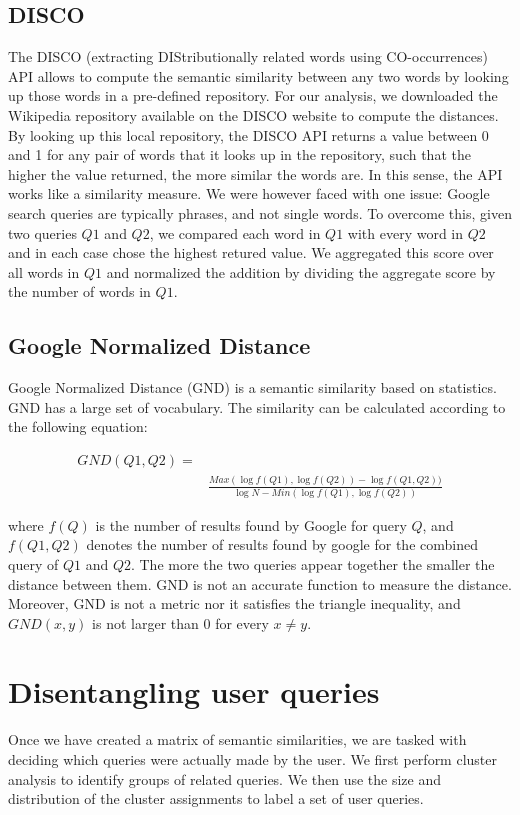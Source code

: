 \documentclass[11pt]{article}
\begin{document}
\begin{multicols}{2}
\subsection{DISCO}
\label{sec:disco}
The DISCO (extracting DIStributionally related words using CO-occurrences) API allows to compute the semantic similarity between any two words by looking up those words in a pre-defined repository. For our analysis, we downloaded the Wikipedia repository available on the DISCO website to compute the distances. By looking up this local repository, the DISCO API returns a value between 0 and 1 for any pair of words that it looks up in the repository, such that the higher the value returned, the more similar the words are. In this sense, the API works like a similarity measure. We were however faced with one issue: Google search queries are typically phrases, and not single words. To overcome this, given two queries $Q1$ and $Q2$, we compared each word in $Q1$ with every word in $Q2$ and in each case chose the highest retured value. We aggregated this score over all words in $Q1$ and normalized the addition by dividing the aggregate score by the number of words in $Q1$.

\subsection{Google Normalized Distance}
\label{sec:gnd}
Google Normalized Distance (GND) is a semantic similarity based on statistics. GND has a large set of vocabulary. The similarity can be calculated according to the following equation:

\begin{eqnarray}
\label{eq:gnd}
GND(Q1, Q2) =& \nonumber \\
&\frac{Max(\log f(Q1), \log f(Q2))-\log f(Q1, Q2))}{\log N - Min(\log f(Q1), \log f(Q2))}
\end{eqnarray}

where $f(Q)$ is the number of results found by Google for query $Q$, and $f(Q1, Q2)$ denotes the number of results found by google for the combined query of $Q1$ and $Q2$.
The more the two queries appear together the smaller the distance between them. GND is not an accurate function to measure the distance\cite{DBLP:GND}. Moreover, GND is not a metric nor it satisfies the triangle inequality, and $GND(x, y)$ is not larger than 0 for every $x \neq y$. 



\section{Disentangling user queries}
\label{sec:disentangle}
Once we have created a matrix of semantic similarities, we are tasked
with deciding which queries were actually made by the user. We first
perform cluster analysis to identify groups of related queries. We
then use the size and distribution of the cluster assignments to label a
set of user queries.


\end{multicols}
\end{document}
